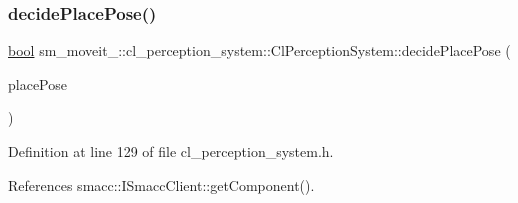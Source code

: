 \subsubsection{\texorpdfstring{decide\+Place\+Pose()}{decidePlacePose()}}
{\footnotesize\ttfamily \hyperlink{classbool}{bool} sm\+\_\+moveit\+\_\+::cl\+\_\+perception\+\_\+system\+::\+Cl\+Perception\+System\+::decide\+Place\+Pose (\begin{DoxyParamCaption}\item[{geometry\+\_\+msgs\+::\+Pose\+Stamped \&}]{place\+Pose }\end{DoxyParamCaption})\hspace{0.3cm}{\ttfamily [inline]}}



Definition at line 129 of file cl\+\_\+perception\+\_\+system.\+h.



References smacc\+::\+I\+Smacc\+Client\+::get\+Component().



